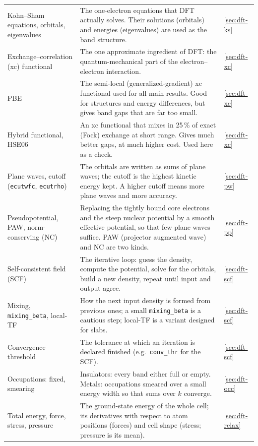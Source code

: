\begin{small}
\begin{longtable}{@{}>{\raggedright\arraybackslash}p{3.3cm}>{\raggedright\arraybackslash}p{9.0cm}>{\raggedright\arraybackslash}p{1.6cm}@{}}
Kohn--Sham equations, orbitals, eigenvalues & The one-electron equations that DFT actually solves. Their solutions
(orbitals) and energies (eigenvalues) are used as the band structure. & \ref{sec:dft-ks} \\
Exchange--correlation (xc) functional & The one approximate ingredient of DFT: the quantum-mechanical part of the
electron--electron interaction. & \ref{sec:dft-xc} \\
PBE & The semi-local (generalized-gradient) xc functional used for all main results. Good for structures and
energy differences, but gives band gaps that are far too small. & \ref{sec:dft-xc} \\
Hybrid functional, HSE06 & An xc functional that mixes in 25\,\% of exact (Fock) exchange at short range. Gives much
better gaps, at much higher cost. Used here as a check. & \ref{sec:dft-xc} \\
Plane waves, cutoff (\texttt{ecutwfc}, \texttt{ecutrho}) & The orbitals are written as sums of plane waves; the cutoff
is the highest kinetic energy kept. A higher cutoff means more plane waves and more accuracy. & \ref{sec:dft-pw} \\
Pseudopotential, PAW, norm-conserving (NC) & Replacing the tightly bound core electrons and the steep nuclear potential
by a smooth effective potential, so that few plane waves suffice. PAW (projector augmented wave) and NC are two kinds. & \ref{sec:dft-pp} \\
Self-consistent field (SCF) & The iterative loop: guess the density, compute the potential, solve for the orbitals,
build a new density, repeat until input and output agree. & \ref{sec:dft-scf} \\
Mixing, \texttt{mixing\_beta}, local-TF & How the next input density is formed from previous ones; a small
\texttt{mixing\_beta} is a cautious step; local-TF is a variant designed for slabs. & \ref{sec:dft-scf} \\
Convergence threshold & The tolerance at which an iteration is declared finished (e.g.\ \texttt{conv\_thr} for the SCF). & \ref{sec:dft-scf} \\
Occupations: fixed, smearing & Insulators: every band either full or empty. Metals: occupations smeared over a small
energy width so that sums over $k$ converge. & \ref{sec:dft-occ} \\
Total energy, force, stress, pressure & The ground-state energy of the whole cell; its derivatives with respect to atom
positions (forces) and cell shape (stress; pressure is its mean). & \ref{sec:dft-relax} \\

\end{longtable}
\end{small}
